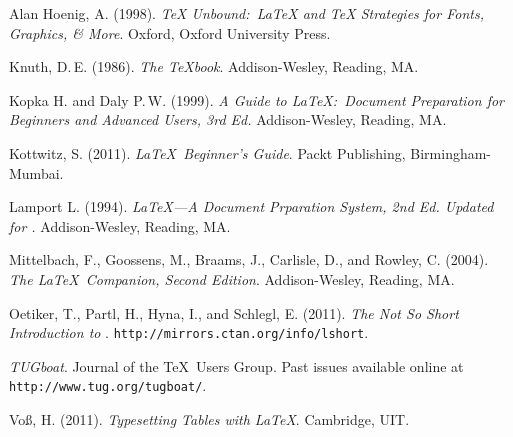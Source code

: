 \documentclass[oldfontcommands,6x9]{pupbook}
\begin{document}
\begin{thebibliography}{1}
Alan Hoenig, A. (1998). \textit{{\TeX} Unbound:\ {\LaTeX} and {\TeX} Strategies for
Fonts, Graphics, \& More}. Oxford, Oxford University Press.

Knuth, D.\,E. (1986). \textit{The {\TeX}book}. Addison-Wesley, Reading, MA.

Kopka H. and Daly P.\,W. (1999). \textit{A Guide to \LaTeX:\ Document
Preparation for Beginners and Advanced Users, 3rd Ed.} Addison-Wesley, Reading, MA.

Kottwitz, S. (2011). \textit{\LaTeX\ Beginner's Guide}. Packt Publishing, Birmingham-Mumbai.

Lamport L. (1994). \textit{\LaTeX---A Document Prparation System, 2nd Ed. Updated for
\LaTeXe.} Addison-Wesley, Reading, MA.

Mittelbach, F., Goossens, M., Braams, J., Carlisle, D., and Rowley, C. (2004). \textit{The \LaTeX\ Companion, Second Edition}. 
Addison-Wesley, Reading, MA.

Oetiker, T., Partl, H., Hyna, I., and Schlegl, E. (2011). \textit{The Not So Short Introduction to \LaTeXe}. \texttt{http://mirrors.ctan.org/info/lshort}.

\textit{TUGboat}. Journal of the \TeX\ Users Group. Past issues available online at \texttt{http://www.tug.org/tugboat/}.

Vo\ss, H. (2011). \textit{Typesetting Tables with \LaTeX}. Cambridge, UIT. 

\end{thebibliography}

\printindex
\end{document}
